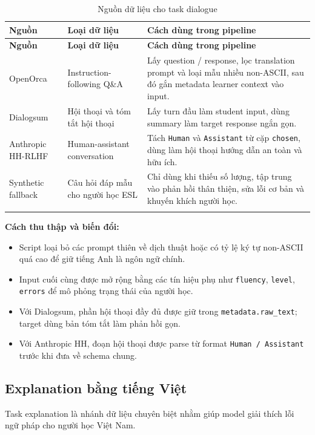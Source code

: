 \documentclass[12pt,a4paper]{article}
\begin{document}
\begin{longtable}{p{3.4cm}p{4.1cm}p{7cm}}
\toprule
\textbf{Nguồn} & \textbf{Loại dữ liệu} & \textbf{Cách dùng trong pipeline} \\
\midrule
\endfirsthead
\toprule
\textbf{Nguồn} & \textbf{Loại dữ liệu} & \textbf{Cách dùng trong pipeline} \\
\midrule
\endhead
OpenOrca & Instruction-following Q\&A & Lấy question / response, lọc translation prompt và loại mẫu nhiều non-ASCII, sau đó gắn metadata learner context vào input. \\
Dialogsum & Hội thoại và tóm tắt hội thoại & Lấy turn đầu làm student input, dùng summary làm target response ngắn gọn. \\
Anthropic HH-RLHF & Human-assistant conversation & Tách \texttt{Human} và \texttt{Assistant} từ cặp \texttt{chosen}, dùng làm hội thoại hướng dẫn an toàn và hữu ích. \\
Synthetic fallback & Câu hỏi đáp mẫu cho người học ESL & Chỉ dùng khi thiếu số lượng, tập trung vào phản hồi thân thiện, sửa lỗi cơ bản và khuyến khích người học. \\
\bottomrule
\caption{Nguồn dữ liệu cho task dialogue}
\end{longtable}

\textbf{Cách thu thập và biến đổi:}
\begin{itemize}[leftmargin=1.2cm]
    \item Script loại bỏ các prompt thiên về dịch thuật hoặc có tỷ lệ ký tự non-ASCII quá cao để giữ tiếng Anh là ngôn ngữ chính.
    \item Input cuối cùng được mở rộng bằng các tín hiệu phụ như \texttt{fluency}, \texttt{level}, \texttt{errors} để mô phỏng trạng thái của người học.
    \item Với Dialogsum, phần hội thoại đầy đủ được giữ trong \texttt{metadata.raw\_text}; target dùng bản tóm tắt làm phản hồi gọn.
    \item Với Anthropic HH, đoạn hội thoại được parse từ format \texttt{Human / Assistant} trước khi đưa về schema chung.
\end{itemize}

\subsection{Explanation bằng tiếng Việt}

Task explanation là nhánh dữ liệu chuyên biệt nhằm giúp model giải thích lỗi ngữ pháp cho người học Việt Nam.
\end{document}

